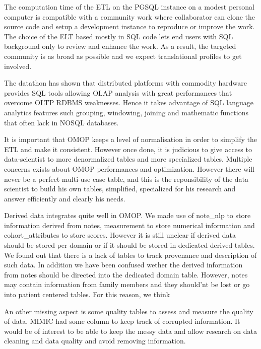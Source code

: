 
The computation time of the ETL on the PGSQL instance on a modest personal
computer is compatible with a community work where collaborator can clone the
source code and setup a development instance to reproduce or improve the work.
The choice of the ELT based mostly in SQL code lets end users with SQL
background only to review and enhance the work. As a result, the targeted
community is as broad as possible and we expect translational profiles to get
involved.

The datathon has shown that distributed platforms with commodity hardware
provides SQL tools allowing OLAP analysis with great performances that overcome
OLTP RDBMS weaknesses. Hence it takes advantage of SQL language analytics
features such grouping, windowing, joining and mathematic functions that often
lack in NOSQL databases.

It is important that OMOP keeps a level of normalisation in order to simplify
the ETL and make it consistent. However once done, it is judicious to give
access to data-scientist to more denormalized tables and more specialized
tables. Multiple concerns exists about OMOP performances and optimization.
However there will never be a perfect multi-use case table, and this is the
reponsibility of the data scientist to build his own tables, simplified,
specialized for his research and answer efficiently and clearly his needs.

Derived data integrates quite well in OMOP. We made use of note\_nlp to store
information derived from notes, measurement to store numerical information and
cohort\_attributes to store scores. However it is still unclear if derived data
should be stored per domain or if it should be stored in dedicated derived
tables. We found out that there is a lack of tables to track provenance and
description of such data. In addition we have been confused wether the derived
information from notes should be directed into the dedicated domain table.
However, notes may contain information from family members and they should'nt
be lost or go into patient centered tables. For this reason, we think

An other missing aspect is some quality tables to assess and measure the
quality of data. MIMIC had some column to keep track of corrupted information.
It would be of interest to be able to keep the messy data and allow research on
data cleaning and data quality and avoid removing information.


